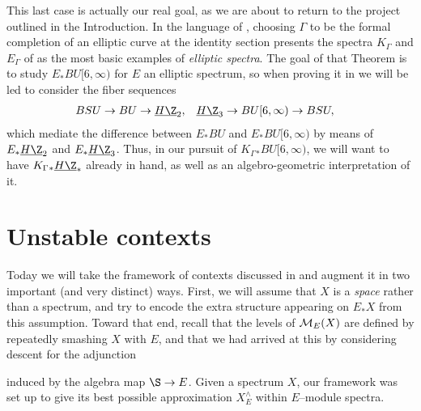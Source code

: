 This last case is actually our real goal, as we are about to return to the project outlined in the Introduction.  In the language of , choosing $\Gamma$ to be the formal completion of an elliptic curve at the identity section presents the spectra $K_\Gamma$ and $E_\Gamma$ of  as the most basic examples of \textit{elliptic spectra}.  The goal of that Theorem is to study $E_* BU[6, \infty)$ for $E$ an elliptic spectrum, so when proving it in  we will be led to consider the fiber sequences
\begin{align*}
BSU \to BU & \to \OS{H\Z}{2}, & \OS{H\Z}{3} \to BU[6, \infty) & \to BSU,
\end{align*}
which mediate the difference between $E_* BU$ and $E_* BU[6, \infty)$ by means of $E_* \OS{H\Z}{2}$ and $E_* \OS{H\Z}{3}$.  Thus, in our pursuit of $K_\Gamma{}_* BU[6, \infty)$, we will want to have $K_\Gamma{}_* \OS{H\Z}{*}$ already in hand, as well as an algebro-geometric interpretation of it.





\section{Unstable contexts}\label{UnstableContextsSection}

Today we will take the framework of contexts discussed in  and augment it in two important (and very distinct) ways.  First, we will assume that $X$ is a \emph{space} rather than a spectrum, and try to encode the extra structure appearing on $E_* X$ from this assumption.  Toward that end, recall that the levels of $\mathcal{M}_{E}(X)$ are defined by repeatedly smashing $X$ with $E$, and that we had arrived at this by considering descent for the adjunction
\begin{center}
\end{center}
induced by the algebra map $\S \to E$.  Given a spectrum $X$, our framework was set up to give its best possible approximation $X^\wedge_E$ within $E$--module spectra.

